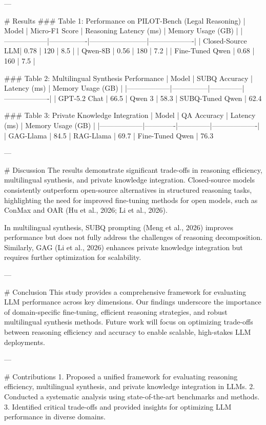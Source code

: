 ---

# Results  
### Table 1: Performance on PILOT-Bench (Legal Reasoning)  
| Model            | Micro-F1 Score | Reasoning Latency (ms) | Memory Usage (GB) |  
|------------------|----------------|------------------------|-------------------|  
| Closed-Source LLM| 0.78           | 120                    | 8.5               |  
| Qwen-8B          | 0.56           | 180                    | 7.2               |  
| Fine-Tuned Qwen  | 0.68           | 160                    | 7.5               |  

### Table 2: Multilingual Synthesis Performance  
| Model            | SUBQ Accuracy | Latency (ms) | Memory Usage (GB) |  
|------------------|---------------|--------------|-------------------|  
| GPT-5.2 Chat     | 66.5%
| Qwen 3           | 58.3%
| SUBQ-Tuned Qwen  | 62.4%

### Table 3: Private Knowledge Integration  
| Model            | QA Accuracy | Latency (ms) | Memory Usage (GB) |  
|------------------|-------------|--------------|-------------------|  
| GAG-Llama        | 84.5%
| RAG-Llama        | 69.7%
| Fine-Tuned Qwen  | 76.3%

---

# Discussion  
The results demonstrate significant trade-offs in reasoning efficiency, multilingual synthesis, and private knowledge integration. Closed-source models consistently outperform open-source alternatives in structured reasoning tasks, highlighting the need for improved fine-tuning methods for open models, such as ConMax and OAR (Hu et al., 2026; Li et al., 2026).  

In multilingual synthesis, SUBQ prompting (Meng et al., 2026) improves performance but does not fully address the challenges of reasoning decomposition. Similarly, GAG (Li et al., 2026) enhances private knowledge integration but requires further optimization for scalability.  

---

# Conclusion  
This study provides a comprehensive framework for evaluating LLM performance across key dimensions. Our findings underscore the importance of domain-specific fine-tuning, efficient reasoning strategies, and robust multilingual synthesis methods. Future work will focus on optimizing trade-offs between reasoning efficiency and accuracy to enable scalable, high-stakes LLM deployments.  

---

# Contributions  
1. Proposed a unified framework for evaluating reasoning efficiency, multilingual synthesis, and private knowledge integration in LLMs.  
2. Conducted a systematic analysis using state-of-the-art benchmarks and methods.  
3. Identified critical trade-offs and provided insights for optimizing LLM performance in diverse domains.  

